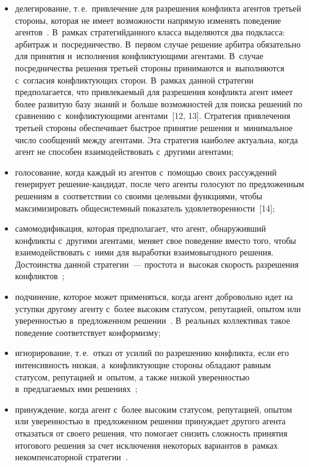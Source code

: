 \begin{multicols}{2}
\begin{itemize}
  \item делегирование, т.\,е.\ привлечение для разрешения конфликта агентов 
третьей стороны, которая не имеет воз\-мож\-ности напрямую изменять поведение 
агентов~\cite{11-l}. В~рамках стратегий\linebreak данного класса выделяются два 
подкласса: арбитраж и~посредничество. В~первом случае решение арбитра 
обязательно для принятия и~исполнения конфликтующими агентами. \mbox{В~случае} 
посредничества решения третьей стороны принимаются и~выполняются 
с~согласия конфликтующих сторон. В~рамках данной стратегии 
предполагается, что привлекаемый для разрешения конфликта агент имеет 
более развитую базу знаний и~больше возможностей для поиска решений по 
сравнению с~конфликтующими агентами~[12, 13]. Стратегия привлечения 
третьей стороны обеспечивает быстрое принятие решения и~минимальное 
число сообщений между агентами. Эта стратегия наиболее актуальна, когда 
агент не способен взаимодействовать с~другими агентами;
  \item голосование, когда каждый из агентов с~по\-мощью своих рассуждений 
генерирует ре\-ше\-ние-кан\-ди\-дат, после чего агенты голосуют по 
предложенным решениям в~соответствии со своими целевыми функциями, 
чтобы максимизировать об\-ще\-сис\-тем\-ный показатель удовлетворенности~[14];
  \item самомодификация, которая предполагает, что агент, об\-на\-ру\-жив\-ший 
конфликты с~другими агентами, меняет свое поведение вместо того, чтобы 
взаимодействовать с~ними для выработки взаимовыгодного решения. 
Достоинства данной стратегии~--- простота и~высокая скорость разрешения 
конфликтов~\cite{10-l};
  \item  подчинение, которое может применяться, когда агент добровольно 
идет на уступки другому агенту с~более высоким статусом, репутацией, опытом 
или уверенностью в~предложенном решении~\cite{11-l}. В~реальных 
коллективах такое поведение соответствует конформизму;\\[-10pt]
  \item игнорирование, т.\,е.\ отказ от усилий по разрешению конфликта, если 
его интенсивность низкая, а~конфликтующие стороны обладают равным 
статусом, репутацией и~опытом, а также низкой уверенностью в~предлагаемых 
ими решениях~\cite{11-l};
  \item  принуждение, когда агент с~более высоким статусом, репутацией, 
опытом или уверенностью в~предложенном решении принуждает другого 
агента отказаться от своего решения, что помогает снизить слож\-ность принятия 
итогового решения за счет исключения некоторых вариантов в~рамках 
некомпенсаторной стратегии~\cite{14-l}. 
  \end{itemize}
  

\end{multicols}
